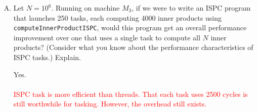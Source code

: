 \documentclass[11pt]{article}
\newenvironment{choice}{\begin{enumerate}[A.]}{\end{enumerate}}
\newenvironment{answer}{\begin{minipage}[c][1.5in]{\textwidth}}{\end{minipage}}
\begin{document}
\begin{choice}
\begin{answer}
\end{answer}

\newpage
\item
Let $N = 10^6$.
Running on machine $M_3$, if we were to write an ISPC program that launches
  250 tasks, each computing 4000 inner products using
  \texttt{computeInnerProductISPC}, would this program get an overall
  performance improvement over one that uses a single task to compute all $N$ inner products?
(Consider what you know about the performance characteristics of ISPC tasks.)
Explain.

\begin{answer}
Yes. \\ \\
\textcolor{red}{
  ISPC task is more efficient than threads. That each task uses 2500 cycles
  is still worthwhile for tasking. However, the overhead still exists. 
}

\end{answer}
\end{choice}
\end{document}
